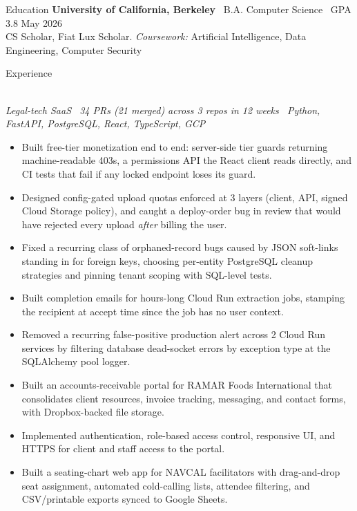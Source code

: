 \documentclass{resume}
\begin{document}
\begin{rSection}{Education}
\textbf{University of California, Berkeley} \textbar\ B.A. Computer Science \textbar\ GPA 3.8 \hfill May 2026\\
CS Scholar, Fiat Lux Scholar. \textit{Coursework:} Artificial Intelligence, Data Engineering, Computer Security
\end{rSection}

\begin{rSection}{Experience}

\\
\textit{Legal-tech SaaS \textbar\ 34 PRs (21 merged) across 3 repos in 12 weeks \textbar\ Python, FastAPI, PostgreSQL, React, TypeScript, GCP}
\begin{itemize}
  \item Built free-tier monetization end to end: server-side tier guards returning machine-readable 403s, a permissions API the React client reads directly, and CI tests that fail if any locked endpoint loses its guard.
  \item Designed config-gated upload quotas enforced at 3 layers (client, API, signed Cloud Storage policy), and caught a deploy-order bug in review that would have rejected every upload \emph{after} billing the user.
  \item Fixed a recurring class of orphaned-record bugs caused by JSON soft-links standing in for foreign keys, choosing per-entity PostgreSQL cleanup strategies and pinning tenant scoping with SQL-level tests.
  \item Built completion emails for hours-long Cloud Run extraction jobs, stamping the recipient at accept time since the job has no user context.
  \item Removed a recurring false-positive production alert across 2 Cloud Run services by filtering database dead-socket errors by exception type at the SQLAlchemy pool logger.
\end{itemize}

\begin{itemize}
  \item Built an accounts-receivable portal for RAMAR Foods International that consolidates client resources, invoice tracking, messaging, and contact forms, with Dropbox-backed file storage.
  \item Implemented authentication, role-based access control, responsive UI, and HTTPS for client and staff access to the portal.
  \item Built a seating-chart web app for NAVCAL facilitators with drag-and-drop seat assignment, automated cold-calling lists, attendee filtering, and CSV/printable exports synced to Google Sheets.
\end{itemize}


\end{rSection}
\end{document}
